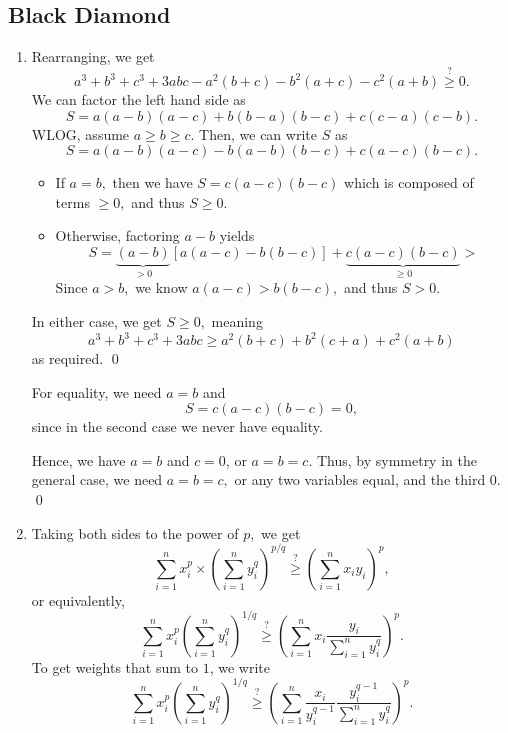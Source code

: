 \documentclass[12pt]{article}
\begin{document}
\subsection{Black Diamond}
\begin{enumerate}
  \item[10] Rearranging, we get
    $$
    a^3 + b^3 + c^3 +3abc - a^2(b+c) - b^2(a+c) - c^2(a+b) \overset{?}{\geq }0.
    $$
    We can factor the left hand side as
    $$
    S = a(a-b)(a-c)  + b(b-a)(b-c) + c(c- a)(c-b).
    $$
    WLOG, assume $a \geq b \geq c.$ Then, we can write $S$ as
    $$
    S = a(a-b)(a-c) - b(a-b)(b-c) + c(a-c)(b-c).
    $$

    \begin{itemize}
      \item If $a = b,$ then we have $S = c(a-c)(b-c)$ which is
        composed of terms $\geq 0,$ and thus $S \geq 0.$

      \item Otherwise, factoring $a -b $ yields
        $$
        S = \underbrace{(a-b)}_{>0}[a(a-c) - b(b-c)] +
        \underbrace{c(a-c)(b-c)}_{\geq 0}>
        $$
        Since $a > b,$ we know $a(a-c) > b(b-c),$ and thus $S > 0.$
    \end{itemize}

    In either case, we get $S \geq 0,$ meaning
    $$
    a^3 + b^3 + c^3 + 3abc \geq a^2 (b+ c) + b^2 (c + a) + c^2 (a+b)
    $$
    as required. \qed

    For equality, we need $a= b$ and
    $$
    S= c(a-c)(b-c)= 0,
    $$
    since in the second case we never have equality.

    Hence, we have $a = b$ and $c = 0$, or $a = b= c.$ Thus, by
    symmetry in the general case, we need $a = b= c,$ or any two
    variables equal, and the third $0.$ \qed

  \item[11] Taking both sides to the power of $p,$ we get
    $$
    \sum_{i = 1}^{n}x_i^p \times \left(
      \sum_{i = 1}^{n} y_i^q
    \right)^{p/q} \overset{?}{\geq} \left(\sum_{i = 1}^{n} x_iy_i\right)^{p},
    $$
    or equivalently,
    $$
    \sum_{i = 1}^{n}x_i^p \left(
      \sum_{i = 1}^{n} y_i^q
    \right)^{1/q} \overset{?}{\geq} \left(\sum_{i = 1}^{n}
    x_i\dfrac{y_i}{\sum_{i = 1}^{n} y_i^q}\right)^{p}.
    $$
    To get weights that sum to $1$, we write
    $$
    \sum_{i = 1}^{n}x_i^p \left(
      \sum_{i = 1}^{n} y_i^q
    \right)^{1/q} \overset{?}{\geq} \left(\sum_{i = 1}^{n}
    \dfrac{x_i}{y_i^{q-1}}\dfrac{y_i^{q-1}}{\sum_{i = 1}^{n} y_i^q}\right)^{p}.
    $$


\end{enumerate}
\end{document}
